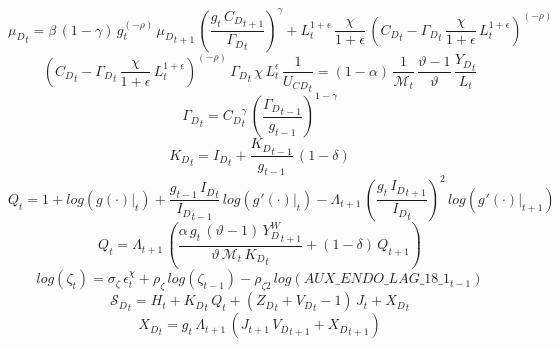 \documentclass[10pt,a4paper]{article}
\begin{document}
\begin{dmath}
{{\mu}_{D}}_{t}=\beta\, \left(1-\gamma\right)\, {g}_{t}^{\left(-\rho\right)}\, {{\mu}_{D}}_{t+1}\, \left(\frac{{g}_{t}\, {C_D}_{t+1}}{{\Gamma_D}_{t}}\right)^{\gamma}+{L}_{t}^{1+\epsilon}\, \frac{\chi}{1+\epsilon}\, \left({C_D}_{t}-{\Gamma_D}_{t}\, \frac{\chi}{1+\epsilon}\, {L}_{t}^{1+\epsilon}\right)^{\left(-\rho\right)}
\end{dmath}
\begin{dmath}
\left({C_D}_{t}-{\Gamma_D}_{t}\, \frac{\chi}{1+\epsilon}\, {L}_{t}^{1+\epsilon}\right)^{\left(-\rho\right)}\, {\Gamma_D}_{t}\, \chi\, {L}_{t}^{\epsilon}\, \frac{1}{{U_{CD}}_{t}}=\left(1-\alpha\right)\, \frac{1}{\mathcal{M}_{t}}\, \frac{\vartheta-1}{\vartheta}\, \frac{{Y_D}_{t}}{{L}_{t}}
\end{dmath}
\begin{dmath}
{\Gamma_D}_{t}={C_D}_{t}^{\gamma}\, \left(\frac{{\Gamma_D}_{t-1}}{{g}_{t-1}}\right)^{1-\gamma}
\end{dmath}
\begin{dmath}
{K_D}_{t}={I_D}_{t}+\frac{{K_D}_{t-1}}{{g}_{t-1}}\, \left(1-\delta\right)
\end{dmath}
\begin{dmath}
{Q}_{t}=1+log\left({\left.       g\left( \cdot \right)            \right|}_{t}\right)+\frac{{g}_{t-1}\, {I_D}_{t}}{{I_D}_{t-1}}\, log\left({\left.       g^‎{\prime}\left( \cdot \right)   \right|}_{t}\right)-{\Lambda}_{t+1}\, \left(\frac{{g}_{t}\, {I_D}_{t+1}}{{I_D}_{t}}\right)^{2}\, log\left({\left.       g^‎{\prime}\left( \cdot \right)   \right|}_{t+1}\right)
\end{dmath}
\begin{dmath}
{Q}_{t}={\Lambda}_{t+1}\, \left(\frac{\alpha\, {g}_{t}\, \left(\vartheta-1\right)\, {Y^W_D}_{t+1}}{\vartheta\, \mathcal{M}_{t}\, {K_D}_{t}}+\left(1-\delta\right)\, {Q}_{t+1}\right)
\end{dmath}
\begin{dmath}
log\left({\zeta}_{t}\right)={\sigma}_{\zeta}\, {\epsilon}^{\chi}_{t}+{\rho}_{\zeta}\, log\left({\zeta}_{t-1}\right)-{\rho}_{\zeta2}\, log\left(AUX\_ENDO\_LAG\_18\_1_{t-1}\right)
\end{dmath}
\begin{dmath}
{\mathcal{S}_{D}}_{t}={H}_{t}+{K_D}_{t}\, {Q}_{t}+\left({Z_D}_{t}+{V_D}_{t}-1\right)\, {J}_{t}+{X_D}_{t}
\end{dmath}
\begin{dmath}
{X_D}_{t}={g}_{t}\, {\Lambda}_{t+1}\, \left({J}_{t+1}\, {V_D}_{t+1}+{X_D}_{t+1}\right)
\end{dmath}
\end{document}
